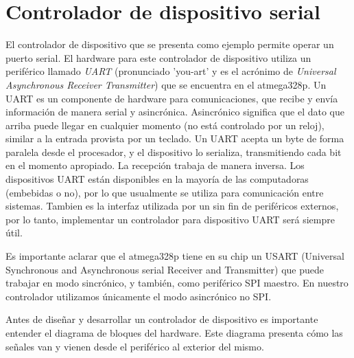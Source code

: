 \documentclass[output=paper, 
colorlinks,
citecolor=brown,
newtxmath
]{langscibook}
\begin{document}
\section {Controlador de dispositivo serial}

El controlador de dispositivo que se presenta como ejemplo permite
operar un puerto serial. El hardware para este controlador
de dispositivo utiliza un periférico llamado \textit{UART}
(pronunciado 'you-art' y es el acrónimo de
\textit{Universal Asynchronous Receiver Transmitter}) que se encuentra en el atmega328p.
Un UART es un componente de hardware para comunicaciones, que recibe y envía 
información de manera serial y asincrónica. Asincrónico significa que el dato 
que arriba puede llegar en cualquier momento (no está controlado por un reloj), 
similar a la entrada provista por un teclado. 
Un UART acepta un byte de forma paralela desde el procesador, y el dispositivo
lo serializa, transmitiendo cada bit en el momento apropiado. La recepción trabaja
de manera inversa. Los dispositivos UART están disponibles en la mayoría
de las computadoras (embebidas o no), por lo que usualmente se utiliza
para comunicación entre sistemas. Tambien es la interfaz utilizada
por un sin fin de periféricos externos, por lo tanto, implementar un
controlador para dispositivo UART será siempre útil.

Es importante aclarar que el atmega328p tiene en su chip un USART (Universal Synchronous and Asynchronous serial Receiver and Transmitter) que puede trabajar
en modo sincrónico, y también, como periférico SPI maestro. En nuestro
controlador utilizamos únicamente el modo asincrónico no SPI.

Antes de diseñar y desarrollar un controlador de dispositivo 
es importante entender el diagrama de bloques del hardware. Este diagrama
presenta cómo las señales van y vienen desde el periférico al exterior del mismo.
\end{document}

